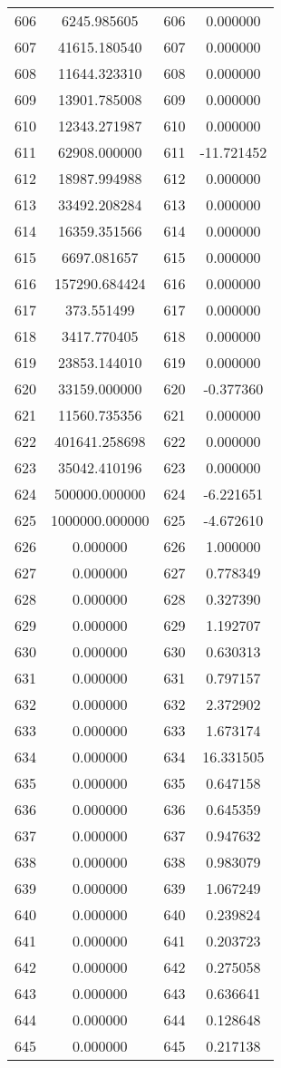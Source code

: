 \documentclass[12pt]{article}
\begin{document}
\begin{longtable}{@{}cccc@{}}
606 & 6245.985605 & 606 & 0.000000 \\
607 & 41615.180540 & 607 & 0.000000 \\
608 & 11644.323310 & 608 & 0.000000 \\
609 & 13901.785008 & 609 & 0.000000 \\
610 & 12343.271987 & 610 & 0.000000 \\
611 & 62908.000000 & 611 & -11.721452 \\
612 & 18987.994988 & 612 & 0.000000 \\
613 & 33492.208284 & 613 & 0.000000 \\
614 & 16359.351566 & 614 & 0.000000 \\
615 & 6697.081657 & 615 & 0.000000 \\
616 & 157290.684424 & 616 & 0.000000 \\
617 & 373.551499 & 617 & 0.000000 \\
618 & 3417.770405 & 618 & 0.000000 \\
619 & 23853.144010 & 619 & 0.000000 \\
620 & 33159.000000 & 620 & -0.377360 \\
621 & 11560.735356 & 621 & 0.000000 \\
622 & 401641.258698 & 622 & 0.000000 \\
623 & 35042.410196 & 623 & 0.000000 \\
624 & 500000.000000 & 624 & -6.221651 \\
625 & 1000000.000000 & 625 & -4.672610 \\
626 & 0.000000 & 626 & 1.000000 \\
627 & 0.000000 & 627 & 0.778349 \\
628 & 0.000000 & 628 & 0.327390 \\
629 & 0.000000 & 629 & 1.192707 \\
630 & 0.000000 & 630 & 0.630313 \\
631 & 0.000000 & 631 & 0.797157 \\
632 & 0.000000 & 632 & 2.372902 \\
633 & 0.000000 & 633 & 1.673174 \\
634 & 0.000000 & 634 & 16.331505 \\
635 & 0.000000 & 635 & 0.647158 \\
636 & 0.000000 & 636 & 0.645359 \\
637 & 0.000000 & 637 & 0.947632 \\
638 & 0.000000 & 638 & 0.983079 \\
639 & 0.000000 & 639 & 1.067249 \\
640 & 0.000000 & 640 & 0.239824 \\
641 & 0.000000 & 641 & 0.203723 \\
642 & 0.000000 & 642 & 0.275058 \\
643 & 0.000000 & 643 & 0.636641 \\
644 & 0.000000 & 644 & 0.128648 \\
645 & 0.000000 & 645 & 0.217138 \\

\end{longtable}
\end{document}
